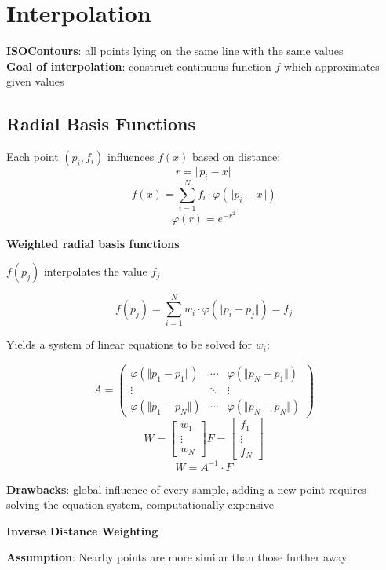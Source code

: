 \section{Interpolation}

\textbf{ISOContours}: all points lying on the same line with the same values \\
\textbf{Goal of interpolation}: construct continuous function $f$ which approximates given values

\subsection{Radial Basis Functions}
Each point $(p_i, f_i)$ influences $f(x)$ based on distance: \\
$$r = \Vert p_i - x \Vert$$
$$f(x) = \sum_{i = 1}^{N} f_i \cdot \varphi(\Vert p_i - x \Vert)$$
$$\varphi(r) = e^{-r^2}$$

\textbf{Weighted radial basis functions}

$f(p_j)$ interpolates the value $f_j$

$$f(p_j) = \sum_{i = 1}^N w_i \cdot \varphi (\Vert p_i - p_j \Vert) = f_j$$

Yields a system of linear equations to be solved for $w_i$:

$$
    A = \begin{pmatrix}
        \varphi(\Vert p_1 - p_1 \Vert) & \cdots & \varphi(\Vert p_N - p_1 \Vert) \\
        \vdots                         & \ddots & \vdots                         \\
        \varphi(\Vert p_1 - p_N \Vert) & \cdots & \varphi(\Vert p_N - p_N \Vert)
    \end{pmatrix}
$$
$$
    W = \begin{bmatrix}
        w_1 \\ \vdots \\ w_N
    \end{bmatrix}
    F = \begin{bmatrix}
        f_1 \\ \vdots \\ f_N
    \end{bmatrix}
$$
$$W = A^{-1} \cdot F$$

\textbf{Drawbacks}: global influence of every sample, adding a new point requires solving the equation system, computationally expensive

\textbf{Inverse Distance Weighting}

\textbf{Assumption}: Nearby points are more similar than those further away.

